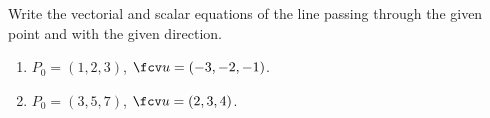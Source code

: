 Write the vectorial and scalar equations of the line passing through the given point and with the given direction.

\begin{enumerate}
\item $P_0=(1,2,3)$, $\fcv u= (-3,-2,-1)$.

\item $P_0=(3,5,7)$, $\fcv u=(2,3,4)$.
\end{enumerate}